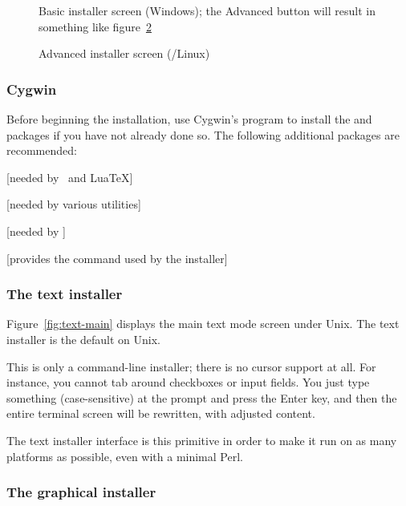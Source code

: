 \documentclass{article}
\begin{document}
\begin{figure}[tb]
\caption{Basic installer screen (Windows); the Advanced button will
  result in something like figure~\ref{fig:advanced-lnx}}\label{fig:basic-w32}
\end{figure}

\begin{figure}[tb]
\caption{Advanced \GUI{} installer screen
  (\GNU/Linux)}\label{fig:advanced-lnx}
\end{figure}


\subsubsection{Cygwin}
\label{sec:cygwin}

Before beginning the installation, use Cygwin's  program to
install the  and  packages if you have
not already done so.  The following additional packages are
recommended:
\begin{itemize*}
\item {} [needed by \XeTeX\ and Lua\TeX]
\item {} [needed by various utilities]
\item {} [needed by ]
\item {} [provides the  command used by the installer]
\end{itemize*}


\subsubsection{The text installer}

Figure~\ref{fig:text-main} displays the main text mode screen under
Unix.  The text installer is the default on Unix.

This is only a command-line installer; there is no cursor support at
all.  For instance, you cannot tab around checkboxes or input fields.
You just type something (case-sensitive) at the prompt and press the
Enter key, and then the entire terminal screen will be rewritten, with
adjusted content.

The text installer interface is this primitive in order to make it run
on as many platforms as possible, even with a minimal Perl.

\subsubsection{The graphical installer}
\label{sec:graphical-inst}
\end{document}
